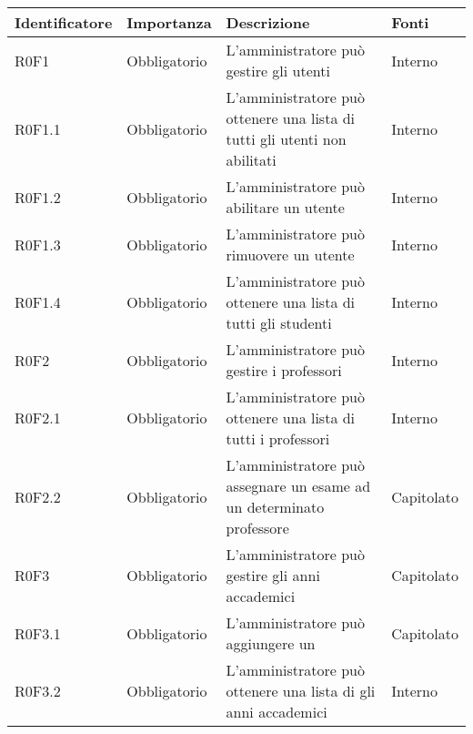 \documentclass[AnalisiDeiRequisiti.tex]{subfiles}
\begin{document}
\label{table:Tabella requisiti funzionali}
\renewcommand*{\arraystretch}{1.2}
\begin{longtable}[H]{p{2.6cm}p{2.5cm}p{5cm}p{2cm}}
	\rowcolor{CHeader} 
	\color{CHeaderText} \textbf{Identificatore} & \color{CHeaderText} \textbf{Importanza} & \color{CHeaderText} \textbf{Descrizione} & \color{CHeaderText} \textbf{Fonti} \\
	\endhead
	R0F1 & Obbligatorio & L'amministratore può gestire gli utenti & Interno \\
	R0F1.1 & Obbligatorio & L'amministratore può ottenere una lista di tutti gli utenti non abilitati & Interno \\  
	R0F1.2 & Obbligatorio & L'amministratore può abilitare un utente & Interno \\  
	R0F1.3 & Obbligatorio & L'amministratore può rimuovere un utente & Interno \\  
	R0F1.4 & Obbligatorio & L'amministratore può ottenere una lista di tutti gli studenti & Interno \\  
	R0F2 & Obbligatorio & L'amministratore può gestire i professori & Interno \\  
	R0F2.1 & Obbligatorio & L'amministratore può ottenere una lista di tutti i professori & Interno \\  
	R0F2.2 & Obbligatorio & L'amministratore può assegnare un esame ad un determinato professore & Capitolato \\  
	R0F3 & Obbligatorio & L'amministratore può gestire gli anni accademici & Capitolato \\  
	R0F3.1 & Obbligatorio & L'amministratore può aggiungere un \citGloss{anno accademico} & Capitolato \\  
	R0F3.2 & Obbligatorio & L'amministratore può ottenere una lista di gli anni accademici & Interno \\  


\end{longtable}
\end{document}
